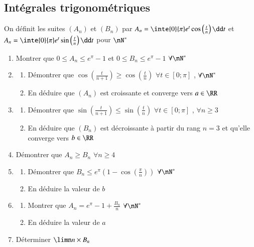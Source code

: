 \documentclass[oneside,12pt]{article}          %
\begin{document}
\subsection{Intégrales trigonométriques}
On définit les suites $(A_n)$ et $(B_n)$ par $A_n=\inte{0}{\pi}e^t\cos\left(\frac{t}{n}\right)\dd t$ et $A_n=\inte{0}{\pi}e^t\sin\left(\frac{t}{n}\right)\dd t$ \quad pour $\nN^*$
\begin{enumerate}\setlength{\itemsep}{0pt}
    \item Montrer que $0\leq A_n\leq e^\pi-1$ \quad et \quad $0\leq B_n\leq e^\pi-1$ \quad $\forall\nN^*$
    \item \begin{enumerate}
        \item Démontrer que $\cos\left(\frac{t}{n+1}\right)\geq\cos\left(\frac{t}{n}\right)$ \quad $\forall t\in[0;\pi]$ , \quad $\forall\nN^*$
        \item En déduire que $(A_n)$ est croissante et converge vers $a\in\RR$
    \end{enumerate}
    \item \begin{enumerate}
        \item Démontrer que $\sin\left(\frac{t}{n+1}\right)\leq\sin\left(\frac{t}{n}\right)$ \quad $\forall t\in[0;\pi]$ , \quad $\forall n\geq3$
        \item En déduire que $(B_n)$ est décroissante à partir du rang $n=3$ et qu'elle converge vers $b\in\RR$
    \end{enumerate}
    \item Démontrer que $A_n\geq B_n$ \quad $\forall n\geq 4$
    \item \begin{enumerate}
        \item Démontrer que $B_n\leq e^\pi\left(1-\cos\left(\frac{\pi}{n}\right)\right)$ \quad $\forall\nN^*$
        \item En déduire la valeur de $b$
    \end{enumerate}
    \item \begin{enumerate}
        \item Montrer que $A_n=e^\pi-1+\frac{B_n}{n}$ \quad $\forall\nN^*$
        \item En déduire la valeur de $a$
    \end{enumerate}
    \item Déterminer $\limn n\times B_n$ 
\end{enumerate}
\end{document}
